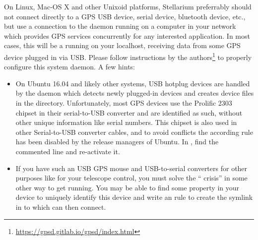 On Linux, Mac-OS X and other Unixoid platforms, Stellarium preferrably
should not connect directly to a GPS USB device, serial device,
bluetooth device, etc., but use a connection to the 
daemon running on a computer in your network which provides GPS
services concurrently for any interested application. In most cases,
this will be a  running on your localhost, receiving
data from some GPS device plugged in via USB.
Please follow instructions by the 
authors\footnote{\url{https://gpsd.gitlab.io/gpsd/index.html}} to properly
configure this system daemon.  A few hints:
\begin{itemize}
\item On Ubuntu 16.04 and likely other systems, USB hotplug devices
  are handled by the  daemon which detects newly
  plugged-in devices and creates device files in the 
  directory. Unfortunately, most GPS devices use the Prolific 2303
  chipset in their serial-to-USB converter and are identified as
  such, without other unique information like serial numbers. 
  This chipset is also used in other Serial-to-USB converter
  cables, and to avoid conflicts the according rule has been disabled
  by the release managers of Ubuntu.  In
  , find the commented line and
  re-activate it.

\item If you have such an USB GPS mouse and USB-to-serial converters
  for other purposes like for your telescope control, you must solve
  the `` crisis'' in some other way to get
   running. You may be able to find some property in
  your device to uniquely identify this device and write an
   rule to create the symlink in  to
  which  can then connect.


\end{itemize}
